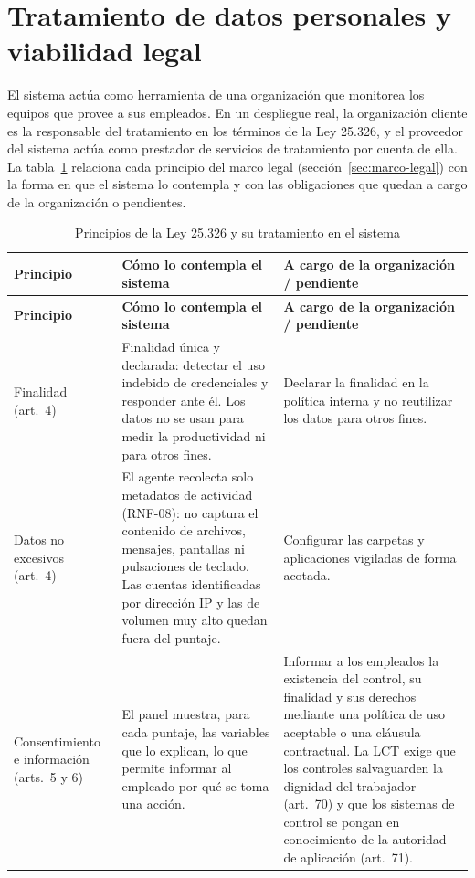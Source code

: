 \section{Tratamiento de datos personales y viabilidad legal}
\label{sec:tratamiento-datos}
El sistema actúa como herramienta de una organización que monitorea los equipos que provee a sus empleados. En un despliegue real, la organización cliente es la responsable del tratamiento en los términos de la Ley 25.326, y el proveedor del sistema actúa como prestador de servicios de tratamiento por cuenta de ella. La tabla~\ref{tab:tratamiento-datos} relaciona cada principio del marco legal (sección~\ref{sec:marco-legal}) con la forma en que el sistema lo contempla y con las obligaciones que quedan a cargo de la organización o pendientes.

\begin{longtable}{>{\raggedright\arraybackslash}p{3.0cm}>{\raggedright\arraybackslash}p{5.8cm}>{\raggedright\arraybackslash}p{5.3cm}}
	\caption{Principios de la Ley 25.326 y su tratamiento en el sistema}
	\label{tab:tratamiento-datos}\\
	\hline
	\textbf{Principio} & \textbf{Cómo lo contempla el sistema} & \textbf{A cargo de la organización / pendiente} \\
	\hline
	\endfirsthead
	\hline
	\textbf{Principio} & \textbf{Cómo lo contempla el sistema} & \textbf{A cargo de la organización / pendiente} \\
	\hline
	\endhead
	Finalidad (art.~4) & Finalidad única y declarada: detectar el uso indebido de credenciales y responder ante él. Los datos no se usan para medir la productividad ni para otros fines. & Declarar la finalidad en la política interna y no reutilizar los datos para otros fines. \\
	\hline
	Datos no excesivos (art.~4) & El agente recolecta solo metadatos de actividad (RNF-08): no captura el contenido de archivos, mensajes, pantallas ni pulsaciones de teclado. Las cuentas identificadas por dirección IP y las de volumen muy alto quedan fuera del puntaje. & Configurar las carpetas y aplicaciones vigiladas de forma acotada. \\
	\hline
	Consentimiento e información (arts.~5 y 6) & El panel muestra, para cada puntaje, las variables que lo explican, lo que permite informar al empleado por qué se toma una acción. & Informar a los empleados la existencia del control, su finalidad y sus derechos mediante una política de uso aceptable o una cláusula contractual. La LCT exige que los controles salvaguarden la dignidad del trabajador (art.~70) y que los sistemas de control se pongan en conocimiento de la autoridad de aplicación (art.~71). \\

\end{longtable}
